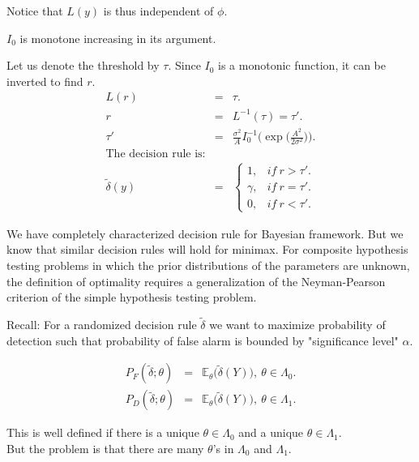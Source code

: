 \documentclass[a4paper,english,12pt]{article}
\begin{document}
\begin{exmp}
\begin{note} 
Notice that $L(y)$ is thus independent of $\phi$.
\end{note}
\begin{note}
$I_0$ is monotone increasing in its argument.
\end{note}
	
Let us denote the threshold by $\tau$. Since $I_0$ is a monotonic function, it can be inverted to find $r$.
\begin{eqnarray}
L(r) &=& \tau.\\
r &=& L^{-1}(\tau) = \tau'.\\
\tau' &=& \frac{\sigma^2}{A}I_0^{-1}\Big(\exp\big(\frac{A^2}{2\sigma^2}\big)\Big).\\
\mbox{The decision rule is:} \nonumber\\
\tilde{\delta}(y) &=&
\begin{cases}
1, &if~ r > \tau'.\\
\gamma, &if~ r = \tau'.\\
0, &if~ r < \tau'.
\end{cases}
\end{eqnarray}
\end{exmp}

We have completely characterized decision rule for Bayesian framework. But we know that similar decision rules will hold for minimax. For composite hypothesis testing problems in which the prior distributions of the parameters are unknown, the definition of optimality requires a generalization of the Neyman-Pearson criterion of the simple hypothesis testing problem.

Recall: For a randomized decision rule $\tilde{\delta}$ we want to maximize probability of detection such that probability of false alarm is bounded by "significance level" $\alpha$.

\begin{eqnarray}
P_F(\tilde{\delta}; \theta) &=& \mathbb{E}_\theta\big(\tilde{\delta}(Y)\big), ~ \theta \in \Lambda_0.\\
P_D(\tilde{\delta}; \theta) &=& \mathbb{E}_\theta\big(\tilde{\delta}(Y)\big), ~ \theta \in \Lambda_1.
\end{eqnarray}	

This is well defined if there is a unique $\theta \in \Lambda_0$ and a unique $\theta \in \Lambda_1$.\\
But the problem is that there are many $\theta$'s in $\Lambda_0$ and $\Lambda_1$.\\
\end{document}

